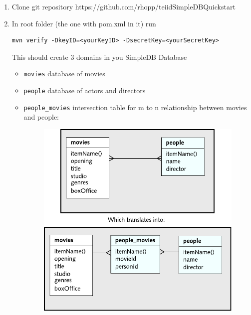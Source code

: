 \documentclass[oneside,12pt]{fithesis2}
\begin{document}
\begin{enumerate}
 \item Clone git repository https://github.com/rhopp/teiidSimpleDBQuickstart
 \item In root folder (the one with pom.xml in it) run
 \begin{Verbatim}[fontsize=\small]
mvn verify -DkeyID=<yourKeyID> -DsecretKey=<yourSecretKey>
 \end{Verbatim}
 This should create 3 domains in you SimpleDB Database
 \begin{itemize}
  \item \texttt{movies} database of movies
  \item \texttt{people} database of actors and directors
  \item \texttt{people\_movies} intersection table for m to n relationship between movies and people:
  \begin{figure}[h]
 \centering
 \includegraphics[scale=1]{exampleStructure}
\end{figure}
 \end{itemize}
 

\end{enumerate}
\end{document}
